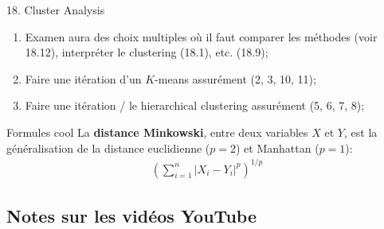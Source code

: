 \documentclass[12pt, titlepage, french]{report}
\begin{document}
\begin{CHPT_SUMM}[label = {CLUSTERS}]{18. Cluster Analysis}
\begin{enumerate}
	\item	Examen aura des choix multiples où il faut comparer les méthodes (voir 18.12), interpréter le clustering (18.1), etc. (18.9);
	\item	Faire une itération d'un $K$-means assurément (2, 3, 10, 11);
	\item	Faire une itération / le hierarchical clustering assurément (5, 6, 7, 8);
\end{enumerate}
\end{CHPT_SUMM}

\begin{FORMULA_SUMM}{Formules cool}
La \textbf{distance Minkowski}, entre deux variables $X$ et $Y$, est la généralisation de la distance euclidienne ($p = 2$) et Manhattan ($p = 1$):
\begin{align*}
	\left( \sum_{i = 1}^{n} | X_{i} - Y_{i} |^{p} \right)^{1/p}
\end{align*}
\end{FORMULA_SUMM}

\subsection{Notes sur les vidéos YouTube}
\end{document}
